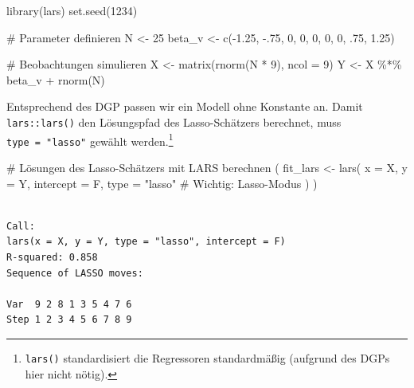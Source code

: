 \documentclass[
  a4paper,
  DIV=11,
  oneside]{scrreprt}
\newenvironment{Shaded}{\begin{snugshade}}{\end{snugshade}}
\newcommand{\AttributeTok}[1]{\textcolor[rgb]{0.40,0.45,0.13}{#1}}
\newcommand{\CommentTok}[1]{\textcolor[rgb]{0.37,0.37,0.37}{#1}}
\newcommand{\DecValTok}[1]{\textcolor[rgb]{0.68,0.00,0.00}{#1}}
\newcommand{\FloatTok}[1]{\textcolor[rgb]{0.68,0.00,0.00}{#1}}
\newcommand{\FunctionTok}[1]{\textcolor[rgb]{0.28,0.35,0.67}{#1}}
\newcommand{\NormalTok}[1]{\textcolor[rgb]{0.00,0.23,0.31}{#1}}
\newcommand{\OtherTok}[1]{\textcolor[rgb]{0.00,0.23,0.31}{#1}}
\newcommand{\SpecialCharTok}[1]{\textcolor[rgb]{0.37,0.37,0.37}{#1}}
\newcommand{\StringTok}[1]{\textcolor[rgb]{0.13,0.47,0.30}{#1}}
\begin{document}
\begin{Shaded}
\begin{Highlighting}[]
\FunctionTok{library}\NormalTok{(lars)}
\FunctionTok{set.seed}\NormalTok{(}\DecValTok{1234}\NormalTok{)}

\CommentTok{\# Parameter definieren}
\NormalTok{N }\OtherTok{\textless{}{-}} \DecValTok{25}
\NormalTok{beta\_v }\OtherTok{\textless{}{-}} \FunctionTok{c}\NormalTok{(}\SpecialCharTok{{-}}\FloatTok{1.25}\NormalTok{, }\SpecialCharTok{{-}}\NormalTok{.}\DecValTok{75}\NormalTok{, }\DecValTok{0}\NormalTok{, }\DecValTok{0}\NormalTok{, }\DecValTok{0}\NormalTok{, }\DecValTok{0}\NormalTok{, }\DecValTok{0}\NormalTok{, .}\DecValTok{75}\NormalTok{, }\FloatTok{1.25}\NormalTok{)}

\CommentTok{\# Beobachtungen simulieren}
\NormalTok{X }\OtherTok{\textless{}{-}} \FunctionTok{matrix}\NormalTok{(}\FunctionTok{rnorm}\NormalTok{(N }\SpecialCharTok{*} \DecValTok{9}\NormalTok{), }\AttributeTok{ncol =} \DecValTok{9}\NormalTok{)}
\NormalTok{Y }\OtherTok{\textless{}{-}}\NormalTok{ X }\SpecialCharTok{\%*\%}\NormalTok{ beta\_v }\SpecialCharTok{+} \FunctionTok{rnorm}\NormalTok{(N)}
\end{Highlighting}
\end{Shaded}

Entsprechend des DGP passen wir ein Modell ohne Konstante an. Damit
\texttt{lars::lars()} den Lösungspfad des Lasso-Schätzers berechnet,
muss \texttt{type\ =\ "lasso"} gewählt werden.\footnote{\texttt{lars()}
  standardisiert die Regressoren standardmäßig (aufgrund des DGPs hier
  nicht nötig).}

\begin{Shaded}
\begin{Highlighting}[]
\CommentTok{\# Lösungen des Lasso{-}Schätzers mit LARS berechnen}
\NormalTok{(}
\NormalTok{  fit\_lars }\OtherTok{\textless{}{-}} \FunctionTok{lars}\NormalTok{(}
    \AttributeTok{x =}\NormalTok{ X, }
    \AttributeTok{y =}\NormalTok{ Y, }
    \AttributeTok{intercept =}\NormalTok{ F,}
    \AttributeTok{type =} \StringTok{"lasso"} \CommentTok{\# Wichtig: Lasso{-}Modus}
\NormalTok{  )}
\NormalTok{)}
\end{Highlighting}
\end{Shaded}

\begin{verbatim}

Call:
lars(x = X, y = Y, type = "lasso", intercept = F)
R-squared: 0.858 
Sequence of LASSO moves:
                      
Var  9 2 8 1 3 5 4 7 6
Step 1 2 3 4 5 6 7 8 9
\end{verbatim}
\end{document}
